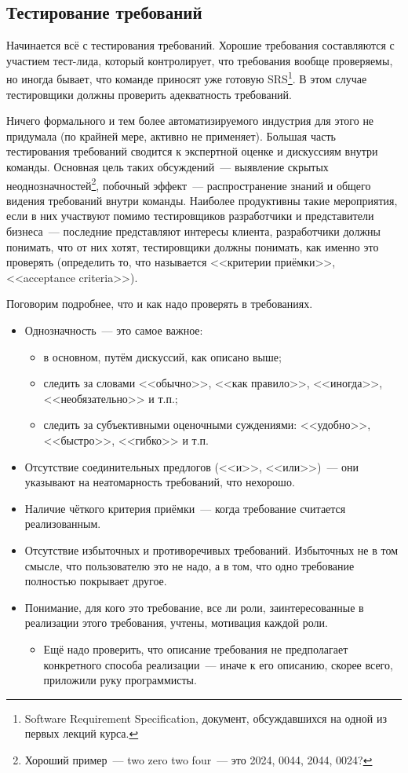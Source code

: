 \documentclass{../../text-style}
\begin{document}
\subsection{Тестирование требований}

Начинается всё с тестирования требований. Хорошие требования составляются с участием тест-лида, который контролирует, что требования вообще проверяемы, но иногда бывает, что команде приносят уже готовую SRS\footnote{Software Requirement Specification, документ, обсуждавшихся на одной из первых лекций курса.}. В этом случае тестировщики должны проверить адекватность требований.

Ничего формального и тем более автоматизируемого индустрия для этого не придумала (по крайней мере, активно не применяет). Большая часть тестирования требований сводится к экспертной оценке и дискуссиям внутри команды. Основная цель таких обсуждений~--- выявление скрытых неоднозначностей\footnote{Хороший пример~--- two zero two four~--- это 2024, 0044, 2044, 0024?}, побочный эффект~--- распространение знаний и общего видения требований внутри команды. Наиболее продуктивны такие мероприятия, если в них участвуют помимо тестировщиков разработчики и представители бизнеса~--- последние представляют интересы клиента, разработчики должны понимать, что от них хотят, тестировщики должны понимать, как именно это проверять (определить то, что называется <<критерии приёмки>>, <<acceptance criteria>>). 

Поговорим подробнее, что и как надо проверять в требованиях.

\begin{itemize}
    \item Однозначность~--- это самое важное:
    \begin{itemize}
        \item в основном, путём дискуссий, как описано выше;
        \item следить за словами <<обычно>>, <<как правило>>, <<иногда>>, <<необязательно>> и т.п.;
        \item следить за субъективными оценочными суждениями: <<удобно>>, <<быстро>>, <<гибко>> и т.п.
    \end{itemize}
    \item Отсутствие соединительных предлогов (<<и>>, <<или>>)~--- они указывают на неатомарность требований, что нехорошо.
    \item Наличие чёткого критерия приёмки~--- когда требование считается реализованным.
    \item Отсутствие избыточных и противоречивых требований. Избыточных не в том смысле, что пользователю это не надо, а в том, что одно требование полностью покрывает другое.
    \item Понимание, для кого это требование, все ли роли, заинтересованные в реализации этого требования, учтены, мотивация каждой роли.
    \begin{itemize}
        \item Ещё надо проверить, что описание требования не предполагает конкретного способа реализации~--- иначе к его описанию, скорее всего, приложили руку программисты.
    \end{itemize}
\end{itemize}
\end{document}
